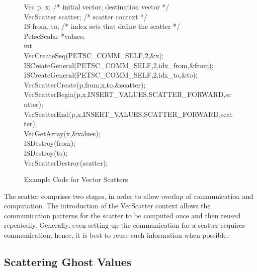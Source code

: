\begin{figure}[tb]
\begin{tabbing}
   Vec         p, x;         /* initial vector, destination vector */\\
   VecScatter  scatter;      /* scatter context */\\
   IS          from, to;     /* index sets that define the scatter */\\
   PetscScalar *values;\\
   int         \\

   VecCreateSeq(PETSC\_COMM\_SELF,2,\&x);\\
   ISCreateGeneral(PETSC\_COMM\_SELF,2,idx\_from,\&from);\\
   ISCreateGeneral(PETSC\_COMM\_SELF,2,idx\_to,\&to);\\
   VecScatterCreate(p,from,x,to,\&scatter);\\
   VecScatterBegin(p,x,INSERT\_VALUES,SCATTER\_FORWARD,scatter);\\
   VecScatterEnd(p,x,INSERT\_VALUES,SCATTER\_FORWARD,scatter);\\
   VecGetArray(x,\&values);\\
   ISDestroy(from);\\
   ISDestroy(to); \\
   VecScatterDestroy(scatter);
\end{tabbing}
\caption{Example Code for Vector Scatters}
\label{fig_vecscatter}
\end{figure}

The scatter comprises two stages, in order to allow overlap of 
communication and computation. The introduction of the 
VecScatter context allows the communication patterns for the scatter
to be computed once and then reused repeatedly. Generally, even 
setting up the communication for a scatter requires communication; 
hence, it is best to reuse such information when possible.

\subsection{Scattering Ghost Values}


